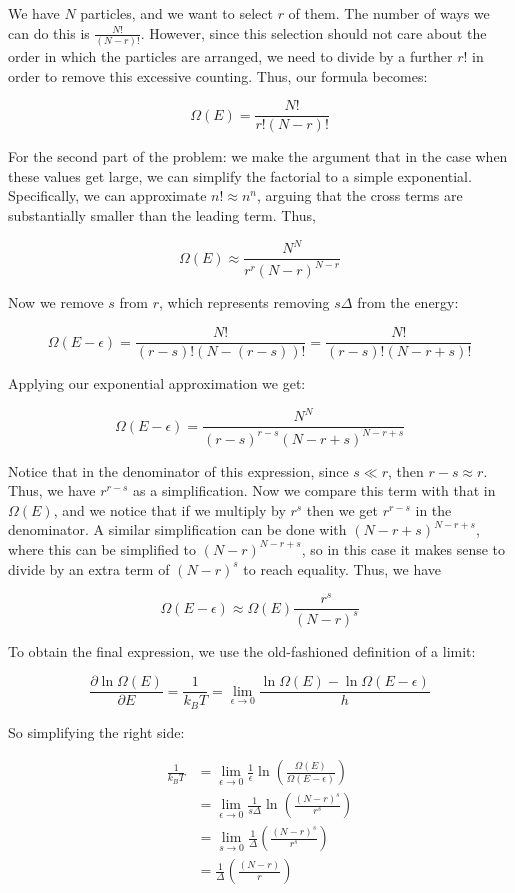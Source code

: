 \documentclass{article}
\begin{document}
\begin{solution}
    We have $N$ particles, and we want to select $r$ of them. The number of ways we can do this is $\frac{N!}{(N - r)!}$. However, since this selection should not care about the order in which the particles are arranged, we need to divide by a further $r!$ in order to remove this excessive counting. Thus, our formula becomes:

    \[ \Omega(E) = \frac{N!}{r!(N- r)!}\]

    For the second part of the problem: we make the argument that in the case when these values get large, we can simplify the factorial to a simple exponential. Specifically, we can approximate $n! \approx n^n$, arguing that the cross terms are substantially smaller than the leading term. Thus, 

    \[ \Omega(E) \approx \frac{N^N}{r^r (N-r)^{N-r}}\]

    Now we remove $s$ from $r$, which represents removing $s\Delta$ from the energy:

    \[ \Omega(E - \epsilon) = \frac{N!}{(r - s)!(N - (r - s))!} = \frac{N!}{(r - s)!(N - r + s)!}\] 

    Applying our exponential approximation we get:

    \[ \Omega(E - \epsilon) = \frac{N^N}{(r-s)^{r-s}(N - r + s)^{N - r + s}}\]

    Notice that in the denominator of this expression, since $s \ll r$, then $r - s \approx r$. Thus, we have $r^{r-s}$ as a simplification. Now we compare this term with that in $\Omega(E)$, and we notice that if we multiply by $r^s$ then we get $r^{r-s}$ in the denominator. A similar simplification can be done with $(N - r + s)^{N - r + s}$, where this can be simplified to $(N - r)^{N - r + s}$, so in this case it makes sense to divide by an extra term of $(N - r)^s$ to reach equality. Thus, we have 

    \[ \Omega(E - \epsilon) \approx \Omega(E) \frac{r^s}{(N - r)^s}\]

    To obtain the final expression, we use the old-fashioned definition of a limit:

    \[ \frac{\partial \ln \Omega(E)}{\partial E} = \frac{1}{k_BT} = \lim_{\epsilon \to 0} \frac{\ln \Omega(E) - \ln \Omega(E-\epsilon)}{h}\]


    So simplifying the right side:

    \begin{align*}
        \frac{1}{k_BT} &= \lim_{\epsilon \to 0} \frac{1}{\epsilon} \ln \left(\frac{\Omega(E)}{\Omega(E - \epsilon)}\right)\\
        &= \lim_{\epsilon \to 0} \frac{1}{s\Delta}\ln\left(\frac{(N - r)^s}{r^s}\right)\\
        &= \lim_{s \to 0} \frac{1}{\Delta} \left(\frac{(N - r)^s}{r^s}\right)\\
        &= \frac{1}{\Delta} \left(\frac{(N - r)}{r}\right)
    \end{align*}


\end{solution}
\end{document}
